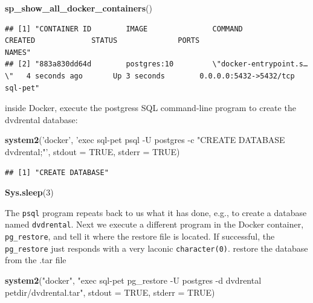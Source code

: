 \documentclass[]{book}
\newenvironment{Shaded}{\begin{snugshade}}{\end{snugshade}}
\newcommand{\DataTypeTok}[1]{\textcolor[rgb]{0.13,0.29,0.53}{#1}}
\newcommand{\DecValTok}[1]{\textcolor[rgb]{0.00,0.00,0.81}{#1}}
\newcommand{\KeywordTok}[1]{\textcolor[rgb]{0.13,0.29,0.53}{\textbf{#1}}}
\newcommand{\NormalTok}[1]{#1}
\newcommand{\OtherTok}[1]{\textcolor[rgb]{0.56,0.35,0.01}{#1}}
\newcommand{\StringTok}[1]{\textcolor[rgb]{0.31,0.60,0.02}{#1}}
\theoremstyle{definition}
\theoremstyle{definition}
\theoremstyle{definition}
\theoremstyle{remark}
\begin{document}
\begin{Shaded}
\begin{Highlighting}[]
\KeywordTok{sp_show_all_docker_containers}\NormalTok{()}
\end{Highlighting}
\end{Shaded}

\begin{verbatim}
## [1] "CONTAINER ID        IMAGE               COMMAND                  CREATED             STATUS              PORTS                    NAMES"    
## [2] "883a830dd64d        postgres:10         \"docker-entrypoint.s…\"   4 seconds ago       Up 3 seconds        0.0.0.0:5432->5432/tcp   sql-pet"
\end{verbatim}

inside Docker, execute the postgress SQL command-line program to create
the dvdrental database:

\begin{Shaded}
\begin{Highlighting}[]
\KeywordTok{system2}\NormalTok{(}\StringTok{'docker'}\NormalTok{, }\StringTok{'exec sql-pet psql -U postgres -c "CREATE DATABASE dvdrental;"'}\NormalTok{,}
        \DataTypeTok{stdout =} \OtherTok{TRUE}\NormalTok{, }\DataTypeTok{stderr =} \OtherTok{TRUE}\NormalTok{)}
\end{Highlighting}
\end{Shaded}

\begin{verbatim}
## [1] "CREATE DATABASE"
\end{verbatim}

\begin{Shaded}
\begin{Highlighting}[]
\KeywordTok{Sys.sleep}\NormalTok{(}\DecValTok{3}\NormalTok{)}
\end{Highlighting}
\end{Shaded}

The \texttt{psql} program repeats back to us what it has done, e.g., to
create a database named \texttt{dvdrental}. Next we execute a different
program in the Docker container, \texttt{pg\_restore}, and tell it where
the restore file is located. If successful, the \texttt{pg\_restore}
just responds with a very laconic \texttt{character(0)}. restore the
database from the .tar file

\begin{Shaded}
\begin{Highlighting}[]
\KeywordTok{system2}\NormalTok{(}\StringTok{"docker"}\NormalTok{, }\StringTok{"exec sql-pet pg_restore -U postgres -d dvdrental petdir/dvdrental.tar"}\NormalTok{, }\DataTypeTok{stdout =} \OtherTok{TRUE}\NormalTok{, }\DataTypeTok{stderr =} \OtherTok{TRUE}\NormalTok{)}
\end{Highlighting}
\end{Shaded}
\end{document}
